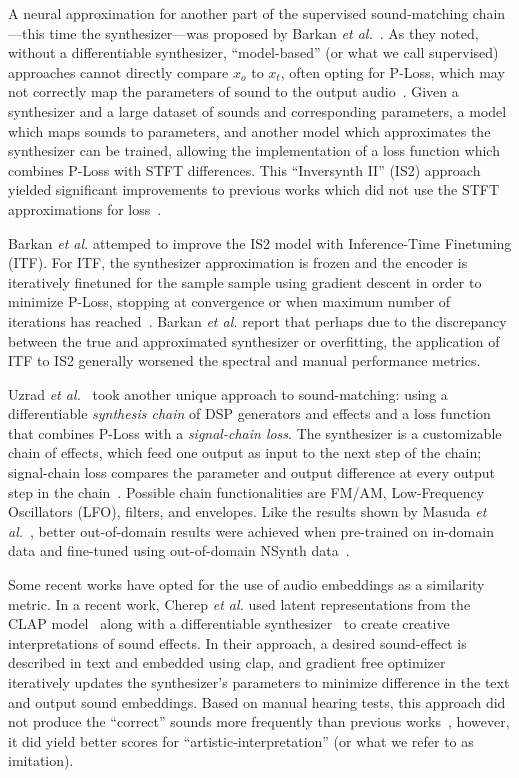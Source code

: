 \documentclass[lettersize,journal]{IEEEtran}
\providecommand{\gls}[1]{#1}
\begin{document}
A neural approximation for another part of the supervised sound-matching chain---this time the synthesizer---was proposed by Barkan \textit{et al.}~\cite{barkan2023inversynthII}. As they noted, without a differentiable synthesizer, ``model-based'' (or what we call supervised) approaches cannot directly compare $x_o$ to $x_t$, often opting for P-Loss, which may not correctly map the parameters of sound to the output audio~\cite{esling2019flow,han2023perceptual,masuda2023improving}. Given a synthesizer and a large dataset of sounds and corresponding parameters, a model which maps sounds to parameters, and another model which approximates the synthesizer can be trained, allowing the implementation of a loss function which combines P-Loss with STFT differences. This ``Inversynth II'' (IS2) approach yielded significant improvements to previous works which did not use the STFT approximations for loss~\cite{esling2019flow,barkan2019inversynth}.

Barkan \textit{et al.} attemped to  improve the IS2 model with Inference-Time
Finetuning (ITF). For ITF, the synthesizer approximation is frozen and the encoder is iteratively finetuned for the sample sample using gradient descent in order to minimize P-Loss, stopping at convergence or when maximum number of iterations has reached~\cite{barkan2023inversynthII}. Barkan \textit{et al.} report that perhaps due to the discrepancy between the true and approximated synthesizer or overfitting, the application of ITF to IS2 generally worsened the spectral and manual performance metrics.


Uzrad \textit{et al.}~\cite{uzrad2024diffmoog} took another unique approach to sound-matching: using a differentiable \textit{synthesis chain} of DSP generators and effects and a loss function that combines P-Loss with a \textit{signal-chain loss}. The synthesizer is a customizable chain of effects, which feed one output as input to the next step of the chain; signal-chain loss compares the parameter and output difference at every output step in the chain~\cite{uzrad2024diffmoog}. Possible chain functionalities are FM/AM, Low-Frequency Oscillators (\gls{LFO}), filters, and envelopes. Like the results shown by Masuda \textit{et al.}~\cite{masuda2021soundmatch}, better out-of-domain results were achieved when pre-trained on in-domain data and fine-tuned using out-of-domain NSynth data~\cite{engel2017neural}.


Some recent works have opted for the use of audio embeddings as a similarity metric. In a recent work, Cherep \textit{et al.} used latent representations from the CLAP model~\cite{wu2023large} along with a differentiable synthesizer~\cite{synthhaxcherep2023} to create creative interpretations of sound effects. In their approach, a desired sound-effect is described in text and embedded using clap, and gradient free optimizer~\cite{evosax2022github} iteratively updates the synthesizer's parameters to minimize difference in the text and output sound embeddings. Based on manual hearing tests, this approach did not produce the ``correct'' sounds more frequently than previous works~\cite{kreuk2022audiogen}, however, it did yield better scores for ``artistic-interpretation'' (or what we refer to as imitation). 


\end{document}

